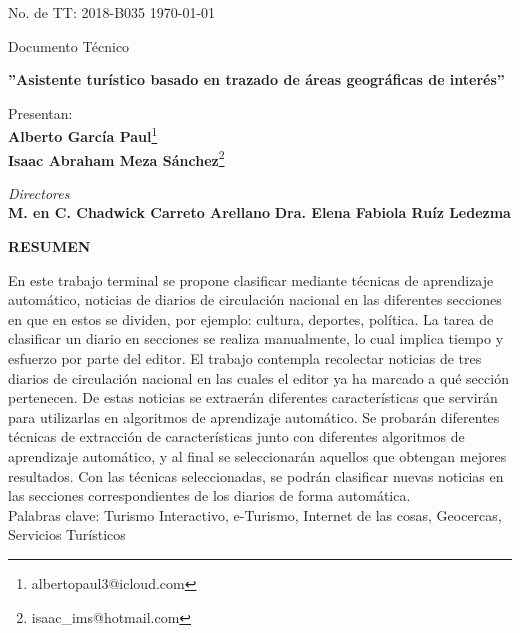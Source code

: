 \begin{titlepage}
\noindent
	\Large No. de TT: 2018-B035  \hfill \large \today \\%

\begin{center}
	\Large Documento Técnico\\[0.7cm]
\end{center}

\begin{center}
	\textbf{\Large ''Asistente turístico basado en trazado de áreas geográficas de interés''}\\[0.7cm]
\end{center}

\begin{center}
	\Large Presentan:\\[0.3cm]
	\textbf{Alberto García Paul}\footnote{albertopaul3@icloud.com}\\[0.2cm]
	\textbf{Isaac Abraham Meza Sánchez}\footnote{isaac\_ims@hotmail.com}\\[0.8cm]
\end{center}

\begin{center}
	\textit{\Large Directores} \\[0.3cm]
	\textbf{M. en C. Chadwick Carreto Arellano} \qquad\qquad  \textbf{Dra. Elena Fabiola Ruíz Ledezma}\\[0.8cm]
\end{center}

\begin{center}
	{\Large \textbf{RESUMEN}}\\[0.2cm]
\end{center}
{\setlength{\parindent}{0pt}
En este trabajo terminal se propone clasificar mediante técnicas de aprendizaje automático,
noticias de diarios de circulación nacional en las diferentes secciones en que en estos se
dividen, por ejemplo: cultura, deportes, política. La tarea de clasificar un diario en secciones se
realiza manualmente, lo cual implica tiempo y esfuerzo por parte del editor.
El trabajo contempla recolectar noticias de tres diarios de circulación nacional en las cuales el
editor ya ha marcado a qué sección pertenecen. De estas noticias se extraerán diferentes
características que servirán para utilizarlas en algoritmos de aprendizaje automático. Se
probarán diferentes técnicas de extracción de características junto con diferentes algoritmos de
aprendizaje automático, y al final se seleccionarán aquellos que obtengan mejores resultados.
Con las técnicas seleccionadas, se podrán clasificar nuevas noticias en las secciones
correspondientes de los diarios de forma automática.\\[0.5CM]
Palabras clave: Turismo Interactivo, e-Turismo, Internet de las cosas, Geocercas, Servicios Turísticos

}
\end{titlepage}

